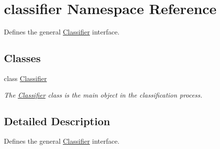 \hypertarget{namespaceclassifier}{}\section{classifier Namespace Reference}
\label{namespaceclassifier}


Defines the general \mbox{\hyperlink{classclassifier_1_1_classifier}{Classifier}} interface.  


\subsection*{Classes}
\begin{DoxyCompactItemize}
\item 
class \mbox{\hyperlink{classclassifier_1_1_classifier}{Classifier}}
\begin{DoxyCompactList}\small\item\em The \mbox{\hyperlink{classclassifier_1_1_classifier}{Classifier}} class is the main object in the classification process. \end{DoxyCompactList}\end{DoxyCompactItemize}


\subsection{Detailed Description}
Defines the general \mbox{\hyperlink{classclassifier_1_1_classifier}{Classifier}} interface. 